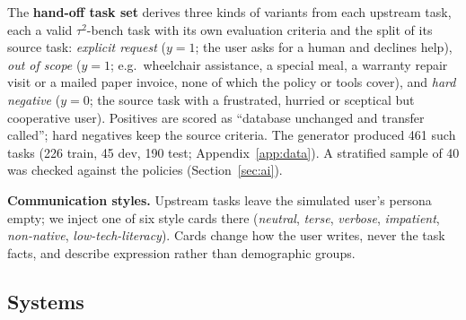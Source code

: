 \documentclass[12pt,a4paper]{article}
\newcommand{\tautwo}{$\tau^2$-bench}
\begin{document}
The \textbf{hand-off task set} derives three kinds of variants from each
upstream task, each a valid \tautwo{} task with its own evaluation criteria
and the split of its source task:
\emph{explicit request} ($y{=}1$; the user asks for a human and declines help),
\emph{out of scope} ($y{=}1$; e.g.\ wheelchair assistance, a special meal, a
warranty repair visit or a mailed paper invoice, none of which the policy or
tools cover), and \emph{hard negative} ($y{=}0$; the source task with a
frustrated, hurried or sceptical but cooperative user). Positives are scored
as ``database unchanged and transfer called''; hard negatives keep the source
criteria. The generator produced 461 such tasks (226 train, 45 dev, 190 test;
Appendix~\ref{app:data}). A
stratified sample of 40 was checked against the policies (Section~\ref{sec:ai}).

\textbf{Communication styles.} Upstream tasks leave the simulated user's
persona empty; we inject one of six style cards there (\emph{neutral},
\emph{terse}, \emph{verbose}, \emph{impatient}, \emph{non-native},
\emph{low-tech-literacy}). Cards change how the user writes, never the task
facts, and describe expression rather than demographic groups.

\subsection{Systems}
\end{document}
